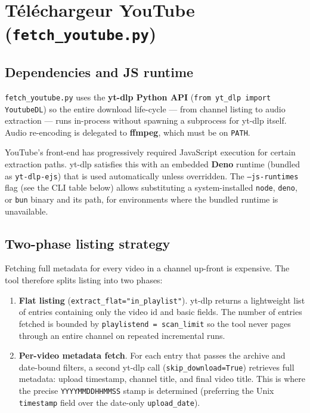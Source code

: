\documentclass[11pt,a4paper]{report}
\newcommand{\code}[1]{\texttt{\small #1}}
\begin{document}
\section{Téléchargeur YouTube (\texttt{fetch\_youtube.py})}

\subsection{Dependencies and JS runtime}

\texttt{fetch\_youtube.py} uses the \textbf{yt-dlp Python API}
(\code{from yt\_dlp import YoutubeDL}) so the entire download life-cycle --- from
channel listing to audio extraction --- runs in-process without spawning a
subprocess for yt-dlp itself.  Audio re-encoding is delegated to \textbf{ffmpeg},
which must be on \code{PATH}.

YouTube's front-end has progressively required JavaScript execution for certain
extraction paths.  yt-dlp satisfies this with an embedded \textbf{Deno} runtime
(bundled as \code{yt-dlp-ejs}) that is used automatically unless overridden.  The
\code{--js-runtimes} flag (see the CLI table below) allows substituting a
system-installed \code{node}, \code{deno}, or \code{bun} binary and its path, for
environments where the bundled runtime is unavailable.

\subsection{Two-phase listing strategy}

Fetching full metadata for every video in a channel up-front is expensive.  The
tool therefore splits listing into two phases:

\begin{enumerate}[leftmargin=1.6em]
  \item \textbf{Flat listing} (\code{extract\_flat="in\_playlist"}).  yt-dlp
        returns a lightweight list of entries containing only the video id and
        basic fields.  The number of entries fetched is bounded by
        \code{playlistend = scan\_limit} so the tool never pages through an entire
        channel on repeated incremental runs.
  \item \textbf{Per-video metadata fetch}.  For each entry that passes the
        archive and date-bound filters, a second yt-dlp call
        (\code{skip\_download=True}) retrieves full metadata: upload timestamp,
        channel title, and final video title.  This is where the precise
        \code{YYYYMMDDHHMMSS} stamp is determined (preferring the Unix
        \code{timestamp} field over the date-only \code{upload\_date}).
\end{enumerate}
\end{document}
